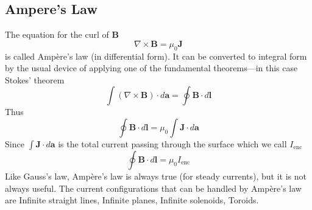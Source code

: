 \documentclass[../../../main.tex]{subfiles}
\begin{document}
\subsection*{Ampere's Law}
The equation for the curl of \textbf{B}
\begin{equation*}
    \nabla\times \mathbf{B}=\mu_0 \mathbf{J}
\end{equation*}
is called Ampère’s law (in differential form). It can be converted to integral form by the usual device of applying one of the fundamental theorems—in this case Stokes’ theorem
\begin{equation*}
    \int(\nabla\times \mathbf{B})\cdot d\mathbf{a}=\oint \mathbf{B}\cdot d\mathbf{l}
\end{equation*}
Thus
\begin{equation*}
    \oint \mathbf{B}\cdot d\mathbf{l}=\mu_0\int\mathbf{J} \cdot d\mathbf{a}
\end{equation*}
Since $\int\mathbf{J} \cdot d\mathbf{a}$ is the total current passing through the surface which we call $I_{\text{enc}}$ 
\begin{equation*}
    \oint \mathbf{B}\cdot d\mathbf{l}=\mu_0I_{\text{enc}}
\end{equation*}
Like Gauss’s law, Ampère’s law is always true (for steady currents), but it is not always useful. The current conﬁgurations that can be handled by Ampère’s law are Inﬁnite straight lines, Inﬁnite planes, Inﬁnite solenoids, Toroids. 
\end{document}
